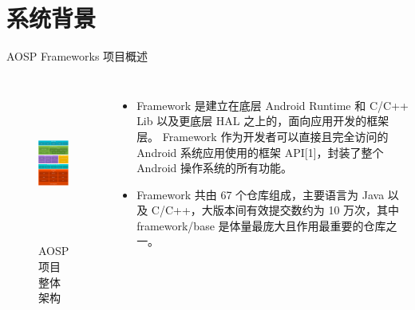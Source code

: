 %
%
%
%
\section{系统背景}
    \begin{frame}{AOSP Frameworks 项目概述}
        \begin{columns}
            \begin{figure}
                \centering \includegraphics[width=1.45in, height=2in]{contents/figure/AOSP.png}
                \caption{AOSP 项目整体架构}
                \label{fig:aosp}
            \end{figure}

            \begin{itemize}
                \item Framework 是建立在底层 Android Runtime 和 C/C++ Lib 以及更底层 HAL 之上的，面向应用开发的框架层。 Framework 作为开发者可以直接且完全访问的 Android 系统应用使用的框架 API[1]，封装了整个 Android 操作系统的所有功能。
                \item Framework 共由 67 个仓库组成\cite{repo-crawler}，主要语言为 Java 以及 C/C++，大版本间有效提交数约为 10 万次，其中 framework/base 是体量最庞大且作用最重要的仓库之一。
            \end{itemize}
        \end{columns}
    \end{frame}

